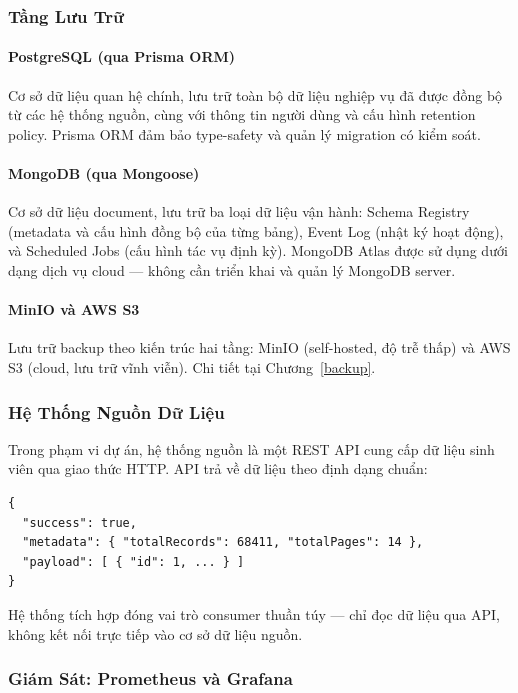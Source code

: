 \subsubsection{Tầng Lưu Trữ}

\paragraph{PostgreSQL (qua Prisma ORM)}

Cơ sở dữ liệu quan hệ chính, lưu trữ toàn bộ dữ liệu nghiệp vụ đã được
đồng bộ từ các hệ thống nguồn, cùng với thông tin người dùng và cấu hình
retention policy. Prisma ORM đảm bảo type-safety và quản lý migration có
kiểm soát.

\paragraph{MongoDB (qua Mongoose)}

Cơ sở dữ liệu document, lưu trữ ba loại dữ liệu vận hành:
Schema Registry (metadata và cấu hình đồng bộ của từng bảng), Event Log
(nhật ký hoạt động), và Scheduled Jobs (cấu hình tác vụ định kỳ). MongoDB
Atlas được sử dụng dưới dạng dịch vụ cloud — không cần triển khai và
quản lý MongoDB server.

\paragraph{MinIO và AWS S3}

Lưu trữ backup theo kiến trúc hai tầng: MinIO (self-hosted, độ trễ thấp)
và AWS S3 (cloud, lưu trữ vĩnh viễn). Chi tiết tại
Chương~\ref{backup}.

\subsubsection{Hệ Thống Nguồn Dữ Liệu}

Trong phạm vi dự án, hệ thống nguồn là một REST API cung cấp dữ liệu
sinh viên qua giao thức HTTP. API trả về dữ liệu theo định dạng chuẩn:

\begin{verbatim}
{
  "success": true,
  "metadata": { "totalRecords": 68411, "totalPages": 14 },
  "payload": [ { "id": 1, ... } ]
}
\end{verbatim}

Hệ thống tích hợp đóng vai trò consumer thuần túy — chỉ đọc dữ liệu qua
API, không kết nối trực tiếp vào cơ sở dữ liệu nguồn.

\subsubsection{Giám Sát: Prometheus và Grafana}

